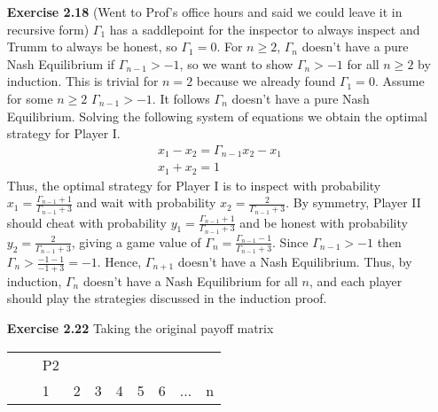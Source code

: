 \documentclass[10pt]{article}[H]
\begin{document}
\begin{itemize}
\begin{itemize}
    \end{itemize} 
    \item [\textbf{Exercise 2.18}] (Went to Prof's office hours and said we could leave it in recursive form) $\Gamma_1$ has a saddlepoint for the inspector to always inspect and Trumm to always be honest, so $\Gamma_1=0$. For $n\ge2$, $\Gamma_n$ doesn't have a pure Nash Equilibrium if $\Gamma_{n-1}>-1$, so we want to show $\Gamma_n>-1$ for all $n\ge2$ by induction. This is trivial for $n=2$ because we already found $\Gamma_1=0$. Assume for some $n\ge2$ $\Gamma_{n-1}>-1$. It follows $\Gamma_n$ doesn't have a pure Nash Equilibrium. 
    Solving the following system of equations we obtain the optimal strategy for Player I.
    \begin{align*}
        x_1-x_2=\Gamma_{n-1}x_2-x_1\\
        x_1+x_2=1
    \end{align*}
    Thus, the optimal strategy for Player I is to inspect with probability $x_1=\frac{\Gamma_{n-1}+1}{\Gamma_{n-1}+3}$ and wait with probability $x_2=\frac{2}{\Gamma_{n-1}+3}$. 
    By symmetry, Player II should cheat with probability $y_1=\frac{\Gamma_{n-1}+1}{\Gamma_{n-1}+3}$ and be honest with probability $y_2=\frac{2}{\Gamma_{n-1}+3}$, giving a game value of $\Gamma_{n}=\frac{\Gamma_{n-1}-1}{\Gamma_{n-1}+3}$. 
    Since $\Gamma_{n-1}>-1$ then $\Gamma_n>\frac{-1-1}{-1+3}=-1$. Hence, $\Gamma_{n+1}$ doesn't have a Nash Equilibrium. Thus, by induction, $\Gamma_n$ doesn't have a Nash Equilibrium for all $n$, and each player should play the strategies discussed in the induction proof.
    \item [\textbf{Exercise 2.22}] Taking the original payoff matrix
    \begin{table}[H]
        \begin{tabular}{llllllllll}
                                                                           &                          & P2                       &                          &                          &                          &                          &                          &                          &                          \\ \cline{2-10} 
        \multicolumn{1}{l|}{}                                              & \multicolumn{1}{l|}{}    & \multicolumn{1}{l|}{1}   & \multicolumn{1}{l|}{2}   & \multicolumn{1}{l|}{3}   & \multicolumn{1}{l|}{4}   & \multicolumn{1}{l|}{5}   & \multicolumn{1}{l|}{6}   & \multicolumn{1}{l|}{...} & \multicolumn{1}{l|}{n}   \\ \cline{2-10} 

\end{tabular}
\end{table}
\end{itemize}
\end{document}
